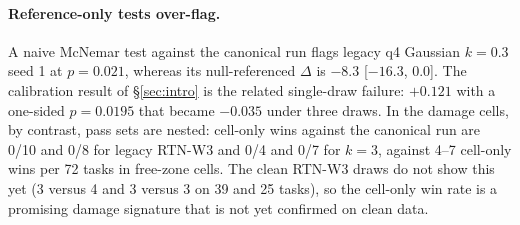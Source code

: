 \paragraph{Reference-only tests over-flag.} A naive McNemar test against the canonical run flags legacy q4 Gaussian $k{=}0.3$ seed 1 at $p = 0.021$, whereas its null-referenced $\Delta$ is $-8.3$\pp{} [$-16.3$, 0.0]. The calibration result of \S\ref{sec:intro} is the related single-draw failure: $+0.121$ with a one-sided $p = 0.0195$ that became $-0.035$ under three draws. In the damage cells, by contrast, pass sets are nested: cell-only wins against the canonical run are 0/10 and 0/8 for legacy RTN-W3 and 0/4 and 0/7 for $k{=}3$, against 4--7 cell-only wins per 72 tasks in free-zone cells. The clean RTN-W3 draws do not show this yet (3 versus 4 and 3 versus 3 on 39 and 25 tasks), so the cell-only win rate is a promising damage signature that is not yet confirmed on clean data.  
